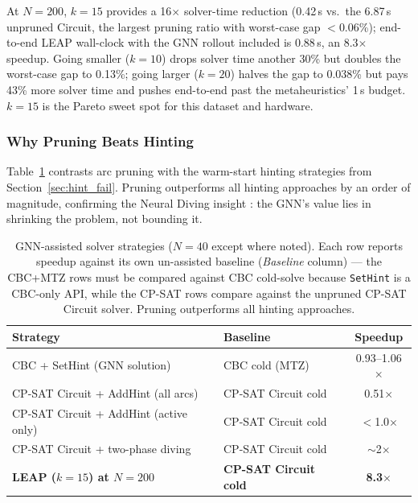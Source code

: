 \documentclass[conference]{IEEEtran}
\begin{document}
At $N{=}200$, $k{=}15$ provides a 16$\times$ solver-time reduction (0.42\,s vs.\ the 6.87\,s unpruned Circuit, the largest pruning ratio with worst-case gap $<$0.06\%); end-to-end LEAP wall-clock with the GNN rollout included is 0.88\,s, an 8.3$\times$ speedup. Going smaller ($k{=}10$) drops solver time another 30\% but doubles the worst-case gap to 0.13\%; going larger ($k{=}20$) halves the gap to 0.038\% but pays 43\% more solver time and pushes end-to-end past the metaheuristics' 1\,s budget. $k{=}15$ is the Pareto sweet spot for this dataset and hardware.

\subsubsection{Why Pruning Beats Hinting}

Table~\ref{tab:hint_comparison} contrasts arc pruning with the warm-start hinting strategies from Section~\ref{sec:hint_fail}. Pruning outperforms all hinting approaches by an order of magnitude, confirming the Neural Diving insight \cite{nair2021neural}: the GNN's value lies in shrinking the problem, not bounding it.

\begin{table}[htbp]
\caption{GNN-assisted solver strategies ($N{=}40$ except where noted). Each row reports speedup against its own un-assisted baseline (\textit{Baseline} column) — the CBC+MTZ rows must be compared against CBC cold-solve because \texttt{SetHint} is a CBC-only API, while the CP-SAT rows compare against the unpruned CP-SAT Circuit solver. Pruning outperforms all hinting approaches.}
\label{tab:hint_comparison}
\centering
\begin{tabular}{@{}llc@{}}
\toprule
\textbf{Strategy} & \textbf{Baseline} & \textbf{Speedup} \\
\midrule
CBC + SetHint (GNN solution)            & CBC cold (MTZ)        & 0.93--1.06$\times$ \\
CP-SAT Circuit + AddHint (all arcs)     & CP-SAT Circuit cold   & 0.51$\times$ \\
CP-SAT Circuit + AddHint (active only)  & CP-SAT Circuit cold   & $<$1.0$\times$ \\
CP-SAT Circuit + two-phase diving       & CP-SAT Circuit cold   & $\sim$2$\times$ \\
\textbf{LEAP ($k{=}15$) at $N{=}200$}   & \textbf{CP-SAT Circuit cold} & \textbf{8.3$\times$} \\
\bottomrule
\end{tabular}
\end{table}
\end{document}

